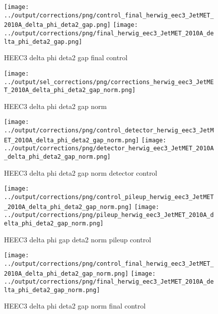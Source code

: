 \documentclass[11pt]{book}
\begin{document}
\begin{figure}[ht]
\centering
\texttt{[image: ../output/corrections/png/control\_final\_herwig\_eec3\_JetMET\_2010A\_delta\_phi\_deta2\_gap.png]}
\texttt{[image: ../output/corrections/png/final\_herwig\_eec3\_JetMET\_2010A\_delta\_phi\_deta2\_gap.png]}
\caption{HEEC3 delta phi deta2 gap final control}
\label{fig:HEEC3_JetMET_2010A_delta_phi_deta2_gap_final_control}
\end{figure}


\begin{figure}[ht]
\centering
\texttt{[image: ../output/sel\_corrections/png/corrections\_herwig\_eec3\_JetMET\_2010A\_delta\_phi\_deta2\_gap\_norm.png]}
\caption{HEEC3 delta phi deta2 gap norm}
\label{fig:HEEC3_JetMET_2010A_delta_phi_deta2_gap_norm}
\end{figure}


\begin{figure}[ht]
\centering
\texttt{[image: ../output/corrections/png/control\_detector\_herwig\_eec3\_JetMET\_2010A\_delta\_phi\_deta2\_gap\_norm.png]}
\texttt{[image: ../output/corrections/png/detector\_herwig\_eec3\_JetMET\_2010A\_delta\_phi\_deta2\_gap\_norm.png]}
\caption{HEEC3 delta phi deta2 gap norm detector control}
\label{fig:HEEC3_JetMET_2010A_delta_phi_deta2_gap_norm_detector_control}
\end{figure}

\begin{figure}[ht]
\centering
\texttt{[image: ../output/corrections/png/control\_pileup\_herwig\_eec3\_JetMET\_2010A\_delta\_phi\_deta2\_gap\_norm.png]}
\texttt{[image: ../output/corrections/png/pileup\_herwig\_eec3\_JetMET\_2010A\_delta\_phi\_deta2\_gap\_norm.png]}
\caption{HEEC3 delta phi gap deta2 norm pileup control}
\label{fig:HEEC3_JetMET_2010A_delta_phi_deta2_gap_norm_pileup_control}
\end{figure}


\begin{figure}[ht]
\centering
\texttt{[image: ../output/corrections/png/control\_final\_herwig\_eec3\_JetMET\_2010A\_delta\_phi\_deta2\_gap\_norm.png]}
\texttt{[image: ../output/corrections/png/final\_herwig\_eec3\_JetMET\_2010A\_delta\_phi\_deta2\_gap\_norm.png]}
\caption{HEEC3 delta phi deta2 gap norm final control}
\label{fig:HEEC3_JetMET_2010A_delta_phi_deta2_gap_norm_final_control}
\end{figure}


\clearpage
\end{document}
